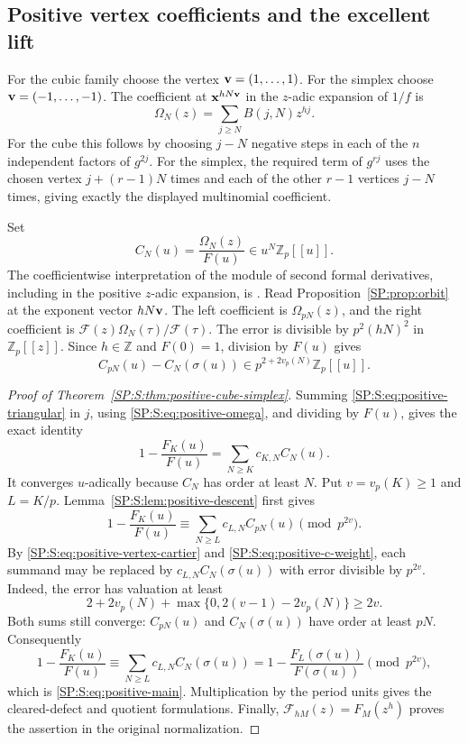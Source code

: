 \documentclass[11pt,a4paper]{article}
\theoremstyle{definition}\newtheorem{definition}[theorem]{Definition}
\theoremstyle{remark}\newtheorem{remark}[theorem]{Remark}
\numberwithin{equation}{section}
\begin{document}
\subsection{Positive vertex coefficients and the excellent lift}

For the cubic family choose the vertex \({\bf v}=(1,\ldots,1)\).
For the simplex choose \({\bf v}=(-1,\ldots,-1)\).
The coefficient at \({\bf x}^{hN{\bf v}}\) in the
\(z\)-adic expansion of \(1/f\) is
\begin{equation}\label{SP:S:eq:positive-omega}
 \Omega_N(z)=\sum_{j\geq N}B(j,N)z^{hj}.
\end{equation}
For the cube this follows by choosing \(j-N\) negative steps in
each of the \(n\) independent factors of \(g^{2j}\).
For the simplex, the required term of \(g^{rj}\) uses the
chosen vertex \(j+(r-1)N\) times and each of the other
\(r-1\) vertices \(j-N\) times, giving exactly the displayed
multinomial coefficient.

Set
\[
 C_N(u)=\frac{\Omega_N(z)}{F(u)}\in u^N\mathbb Z_p[[u]].
\]
The coefficientwise interpretation of the module of second formal
derivatives, including in the positive \(z\)-adic expansion, is
\cite[Section 3, the paragraph following Corollary 3.4]{BV3}.
Read Proposition~\ref{SP:prop:orbit} at the exponent vector
\(hN{\bf v}\).  The left coefficient is \(\Omega_{pN}(z)\),
and the right coefficient is
\(\mathcal F(z)\Omega_N(\tau)/\mathcal F(\tau)\).
The error is divisible by \(p^2(hN)^2\) in \(\mathbb Z_p[[z]]\).
Since \(h\in\mathbb Z\) and \(F(0)=1\), division by \(F(u)\)
gives
\begin{equation}\label{SP:S:eq:positive-vertex-cartier}
 C_{pN}(u)-C_N(\sigma(u))
 \in p^{2+2v_p(N)}\mathbb Z_p[[u]].
\end{equation}

\begin{proof}[Proof of Theorem~\ref{SP:S:thm:positive-cube-simplex}]
Summing \eqref{SP:S:eq:positive-triangular} in \(j\), using
\eqref{SP:S:eq:positive-omega}, and dividing by \(F(u)\), gives
the exact identity
\[
 1-\frac{F_K(u)}{F(u)}
 =\sum_{N\geq K}c_{K,N}C_N(u).
\]
It converges \(u\)-adically because \(C_N\) has order at
least \(N\).
Put \(v=v_p(K)\geq1\) and \(L=K/p\).
Lemma~\ref{SP:S:lem:positive-descent} first gives
\[
 1-\frac{F_K(u)}{F(u)}
 \equiv\sum_{N\geq L}c_{L,N}C_{pN}(u)
 \pmod{p^{2v}}.
\]
By \eqref{SP:S:eq:positive-vertex-cartier} and
\eqref{SP:S:eq:positive-c-weight}, each summand may be replaced by
\(c_{L,N}C_N(\sigma(u))\) with error divisible by \(p^{2v}\).
Indeed, the error has valuation at least
\[
 2+2v_p(N)+\max\{0,2(v-1)-2v_p(N)\}\geq2v.
\]
Both sums still converge: \(C_{pN}(u)\) and
\(C_N(\sigma(u))\) have order at least \(pN\).
Consequently
\[
 1-\frac{F_K(u)}{F(u)}
 \equiv\sum_{N\geq L}c_{L,N}C_N(\sigma(u))
 =1-\frac{F_L(\sigma(u))}{F(\sigma(u))}
 \pmod{p^{2v}},
\]
which is \eqref{SP:S:eq:positive-main}.
Multiplication by the period units gives the cleared-defect and
quotient formulations.  Finally,
\(\mathcal F_{hM}(z)=F_M(z^h)\) proves the assertion in the
original normalization.
\end{proof}
\end{document}
